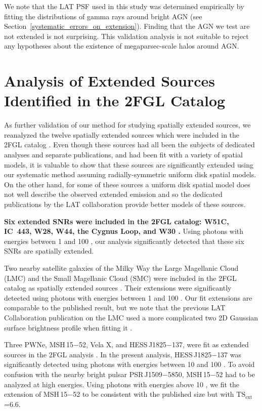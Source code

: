 \documentclass[12pt,preprint]{aastex}
\newcommand{\gev}{\text{GeV}\xspace}
\newcommand{\tsext}{{\ensuremath{\text{TS}_{\text{ext}}}}\xspace}
\newcommand{\newtext}[1]{{\bfseries \color{red}#1}}
\begin{document}
We note that the LAT PSF used in this study was determined
empirically by fitting the distributions of gamma rays around bright AGN (see
Section~\ref{systematic_errors_on_extension}). Finding that the AGN we
test are not extended is not surprising.  This validation analysis is
not suitable to reject any hypotheses about the existence of megaparsec-scale
halos around AGN.

\section{Analysis of Extended Sources Identified in the 2FGL Catalog}
\label{validate_known}

As further validation of our method for studying
spatially extended sources, we reanalyzed the twelve spatially extended
sources which were included in the 2FGL catalog \citep{second_cat}.  
Even though these sources had all been the subjects of dedicated
analyses and separate publications, and had been fit with a variety
of spatial models,
it is valuable to show that
these sources are significantly extended using our systematic 
method assuming radially-symmetric uniform disk spatial models.  On the other hand, for some of
these sources a uniform disk spatial model does not well describe the
observed extended emission and so the dedicated 
publications by the LAT collaboration provide better models of these sources.



\newtext{
Six extended SNRs were
included in the 2FGL catalog: W51C, IC~443, W28, W44, the Cygnus Loop,
and W30
\citep{w51c,ic443,w28,w44,cygnus_loop_lat,w30_lat}.}
Using photons
with energies between
1 \gev and 100 \gev, our analysis significantly detected
that these six SNRs are spatially extended.


Two nearby satellite galaxies of the Milky Way the Large Magellanic Cloud (LMC)
and the Small Magellanic
Cloud (SMC) were included in the 2FGL catalog as spatially extended sources \citep{lmc,smc}.  
Their extensions were significantly
detected using photons with energies between
1 \gev and 100 \gev. Our
fit extensions are comparable to the published result, but we note that
the previous LAT Collaboration publication on the LMC used a more complicated two 2D Gaussian surface
brightness profile when fitting it \citep{lmc}.

Three PWNe, MSH\,15$-$52, Vela X, and HESS\,J1825$-$137, were fit as
extended sources in the 2FGL analysis \citep{msh1552,velax,fermi_hess_j1825}.  
In the present analysis, HESS\,J1825$-$137
was significantly detected using photons with energies between 10
\gev and 100 \gev.  To avoid confusion with the nearby bright pulsar
PSR\,J1509$-$5850, MSH\,15$-$52 had to be analyzed at high energies.
Using photons with energies above 10 \gev, we fit the extension of
MSH\,15$-$52 to be consistent with the published size but with \tsext=6.6.
\end{document}

